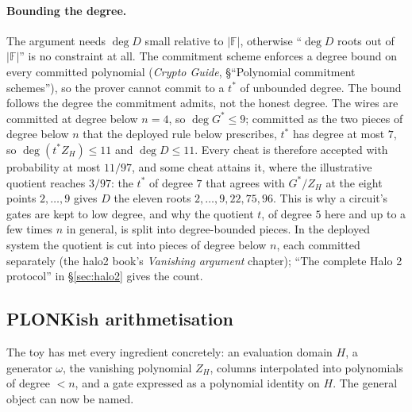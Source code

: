 \documentclass[11pt,a4paper]{article}
\theoremstyle{definition}
\newcommand{\F}{\mathbb{F}}
\newcommand{\ZH}{Z_H}
\begin{document}
\paragraph{Bounding the degree.}
The argument needs $\deg D$ small relative to $|\F|$, otherwise
``$\deg D$ roots out of $|\F|$'' is no constraint at all. The commitment
scheme enforces a degree bound on every committed polynomial
(\emph{Crypto Guide}, \S``Polynomial commitment schemes''), so the prover
cannot commit to a $t^{*}$ of unbounded degree. The bound follows the
degree the commitment admits, not the honest degree. The wires are
committed at degree below $n = 4$, so $\deg G^{*} \le 9$; committed as
the two pieces of degree below $n$ that the deployed rule below
prescribes, $t^{*}$ has degree at most $7$, so $\deg(t^{*}\ZH) \le 11$
and $\deg D \le 11$. Every cheat is therefore accepted with probability
at most $11/97$, and some cheat attains it, where the illustrative
quotient reaches $3/97$:
the $t^{*}$ of degree $7$ that agrees with $G^{*}/\ZH$ at the eight
points $2, \dots, 9$ gives $D$ the eleven roots $2, \dots, 9, 22, 75, 96$.
This is why a circuit's gates are kept to low degree, and why the quotient
$t$, of degree $5$ here and up to a few times $n$ in general, is split
into degree-bounded pieces. In the deployed system the quotient is cut into
pieces of degree below $n$, each committed separately (the halo2 book's
\emph{Vanishing argument} chapter); ``The complete Halo 2 protocol'' in
\S\ref{sec:halo2} gives the count.

\subsection{PLONKish arithmetisation}
\label{sec:arith-plonkish}

The toy has met every ingredient concretely: an evaluation domain $H$, a
generator $\omega$, the vanishing polynomial $\ZH$, columns interpolated
into polynomials of degree $< n$, and a gate expressed as a polynomial
identity on $H$. The general object can now be named.
\end{document}
